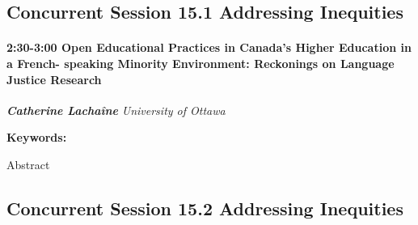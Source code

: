 \documentclass[
]{book}
\begin{document}
\hypertarget{concurrent-session-15.1-addressing-inequities}{%
\subsection*{Concurrent Session 15.1 \textbar{} Addressing Inequities}\label{concurrent-session-15.1-addressing-inequities}}

\begin{session}
\hypertarget{open-educational-practices-in-canadas-higher-education-in-a-french--speaking-minority-environment-reckonings-on-language-justice-research}{%
\paragraph*{\texorpdfstring{2:30-3:00 \textbar{} \textbf{Open
Educational Practices in Canada's Higher Education in a French- speaking
Minority Environment: Reckonings on Language Justice} \textbar{}
Research}{2:30-3:00 \textbar{} Open Educational Practices in Canada's Higher Education in a French- speaking Minority Environment: Reckonings on Language Justice \textbar{} Research}}\label{open-educational-practices-in-canadas-higher-education-in-a-french--speaking-minority-environment-reckonings-on-language-justice-research}}

\textbf{\emph{Catherine Lachaîne}} \textbar{} \emph{University of
Ottawa}

\textbf{Keywords:}

Abstract
\end{session}

\hypertarget{concurrent-session-15.2-addressing-inequities}{%
\subsection*{Concurrent Session 15.2 \textbar{} Addressing Inequities}\label{concurrent-session-15.2-addressing-inequities}}
\end{document}
